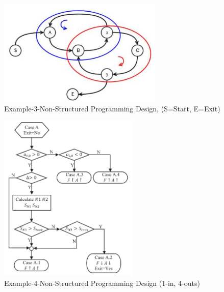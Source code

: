 \clearpage
\pagebreak

\begin{figure}
	\centering
	\caption  {Example-3-Non-Structured Programming Design, (S=Start, E=Exit)}
	\label{img-Example-3-Non-Structured Programming Design}
	\includegraphics[width= 0.70\textwidth]{Chap3/AlgorithmTypes/Example-3-Non-Structured-Programming-design.png} 
\end{figure}		



\begin{figure}
	\centering
	\caption  {Example-4-Non-Structured Programming Design (1-in, 4-outs)}
	\label{img-Example-4-Non-Structured Programming Design}
	\includegraphics[width= 0.60\textwidth]{Chap3/AlgorithmTypes/Example-4-Non-Structured-Programming-design.png} 
\end{figure}		



\clearpage
\pagebreak

